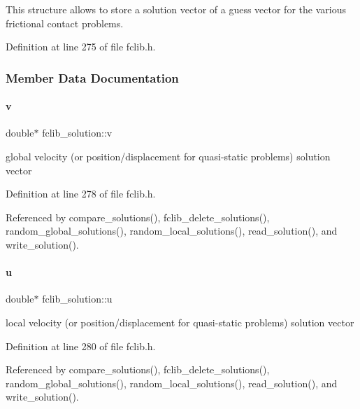 This structure allows to store a solution vector of a guess vector for the various frictional contact problems. 

Definition at line 275 of file fclib.\+h.



\subsubsection{Member Data Documentation}
\mbox{\label{structfclib__solution_a252982ce524686a094223a55c194fea8}} 
\paragraph{\texorpdfstring{v}{v}}
{\footnotesize\ttfamily double$\ast$ fclib\+\_\+solution\+::v}



global velocity (or position/displacement for quasi-\/static problems) solution vector 



Definition at line 278 of file fclib.\+h.



Referenced by compare\+\_\+solutions(), fclib\+\_\+delete\+\_\+solutions(), random\+\_\+global\+\_\+solutions(), random\+\_\+local\+\_\+solutions(), read\+\_\+solution(), and write\+\_\+solution().

\mbox{\label{structfclib__solution_acb160f0dad04b9420388464d256ae41f}} 
\paragraph{\texorpdfstring{u}{u}}
{\footnotesize\ttfamily double$\ast$ fclib\+\_\+solution\+::u}



local velocity (or position/displacement for quasi-\/static problems) solution vector 



Definition at line 280 of file fclib.\+h.



Referenced by compare\+\_\+solutions(), fclib\+\_\+delete\+\_\+solutions(), random\+\_\+global\+\_\+solutions(), random\+\_\+local\+\_\+solutions(), read\+\_\+solution(), and write\+\_\+solution().

